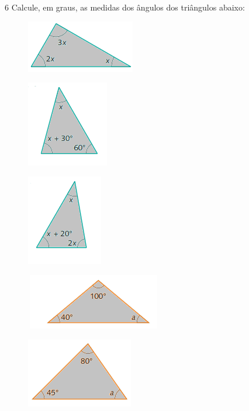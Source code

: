\num{6} Calcule, em graus, as medidas dos ângulos dos triângulos abaixo:
\item
\begin{figure}[H]
\centering\includegraphics[width=1.86458in,height=0.89583in]{./imgSAEB_8_MAT/media/image24.png}
\end{figure}
\item
\begin{figure}[H]
\centering\includegraphics[width=1.40625in,height=1.47917in]{./imgSAEB_8_MAT/media/image25.png}
\end{figure}
\item
\begin{figure}[H]
\centering\includegraphics[width=1.30208in,height=1.5625in]{./imgSAEB_8_MAT/media/image26.png}
\end{figure}
\item
\begin{figure}[H]
\centering\includegraphics[width=2.33333in,height=0.95833in]{./imgSAEB_8_MAT/media/image27.png}
\end{figure}
\item
\begin{figure}[H]
\centering\includegraphics[width=1.83333in,height=1.1875in]{./imgSAEB_8_MAT/media/image28.png}
\end{figure}
